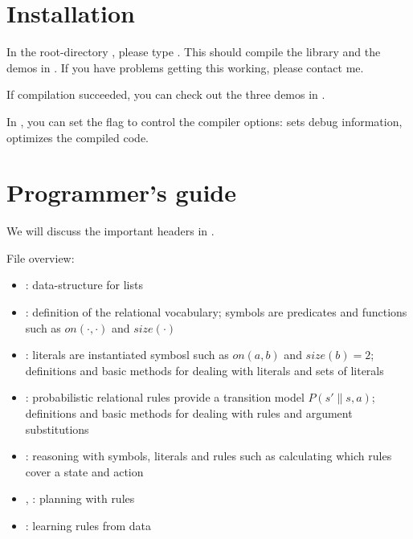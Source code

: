 \documentclass[10pt,twoside,twocolumn,fleqn]{article}
\begin{document}

\section{Installation}

In the root-directory , please type . This
should compile the library  and the demos in
. If you have problems getting this working, please contact me.

If compilation succeeded, you can check out the three demos in
.

In , you can set the flag  to control the
compiler options:  sets debug information,  optimizes the compiled code.




\section{Programmer's guide}

We will discuss the important headers in .

\noindent File overview:
\begin{itemize}
\item {}: data-structure for lists
\item {}: definition of the relational
vocabulary; symbols are predicates and functions such as $on(\cdot,\cdot)$
and $size(\cdot)$
\item {}: literals are instantiated
symbosl such as $on(a,b)$ and $size(b)=2$; definitions and basic methods
for dealing with literals and sets of literals
\item {}: probabilistic relational rules provide a
transition model $P(s' \| s,a)$; definitions and basic methods for dealing
with rules and argument substitutions
\item {}: reasoning with symbols, literals and
rules such as calculating which rules cover a state and action
\item {}, : planning with
rules
\item {}: learning rules from data
\end{itemize}
\end{document}
